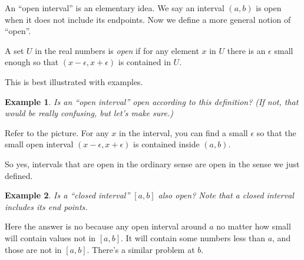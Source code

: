 \documentclass[11pt]{book}
\newenvironment{definition}[1][Definition]{\begin{trivlist}
\item[\hskip \labelsep {\bfseries #1}]}{\end{trivlist}}
\newtheorem{example}{Example}
\numberwithin{example}{chapter}
\begin{document}
An ``open interval'' is an elementary idea.  We say an interval $(a,b)$ is open when it does not include its endpoints.  Now we define a more general notion of ``open''.  




\begin{definition}
A set $U$ in the real numbers is \emph{open} if for any element $x$ in $U$ there is an $\epsilon$ small enough so that $(x-\epsilon , x+\epsilon)$ is contained in $U$.  


\end{definition}



This is best illustrated with examples.  

\begin{example}
Is an ``open interval'' \emph{ open} according to this definition?  (If not, that would be really confusing, but let's make sure.)
\end{example}

Refer to the picture.  For any $x$ in the interval, you can find a small $\epsilon$ so that the small open interval $(x-\epsilon , x+\epsilon)$ is contained inside $(a,b)$. 




\begin{center}
\end{center}


So yes, intervals that are open in the ordinary sense are open in the sense we just defined.  


\begin{example}
Is a ``closed interval'' $[a,b]$ also \emph{open}?  Note that a closed interval includes its end points.

\end{example}

Here the answer is no because any open interval around $a$ no matter how small will contain values not in $[a,b]$.  It will contain some numbers less than $a$, and those are not in $[a,b]$.  There's a similar problem at $b$.  
\end{document}
